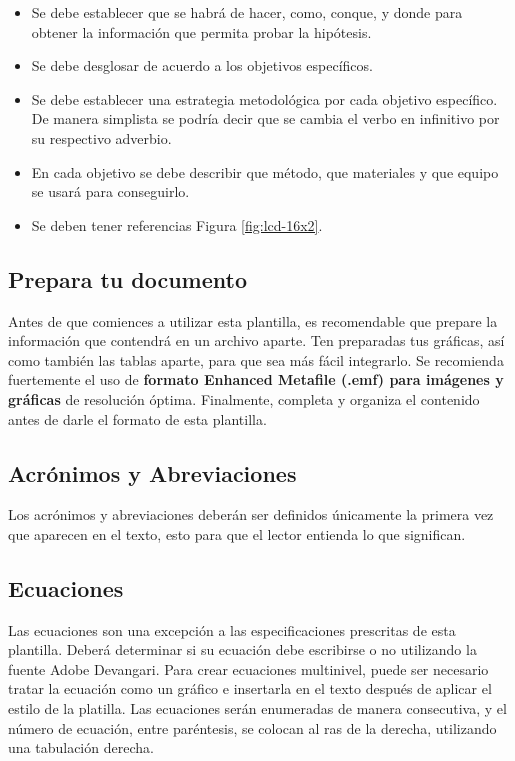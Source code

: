 \begin{itemize}
    \item Se debe establecer que se habrá de hacer, como, conque, y donde para obtener la información que permita probar la hipótesis.  
    \item Se debe desglosar de acuerdo a los objetivos específicos. 
    \item Se debe establecer una estrategia metodológica por cada objetivo específico. De manera simplista se podría decir que se cambia el verbo en infinitivo por su respectivo adverbio.
    \item En cada objetivo se debe describir que método, que materiales y que equipo se usará para conseguirlo.
    \item Se deben tener referencias Figura \ref{fig:lcd-16x2}.
\end{itemize}
% 
% 

% 
% 
\subsection{Prepara tu documento}

Antes de que comiences a utilizar esta plantilla, es recomendable que prepare la información que contendrá en un archivo aparte. 
Ten preparadas tus gráficas, así como también las tablas aparte, para que sea más fácil integrarlo. 
Se recomienda fuertemente el uso de \textbf{formato Enhanced Metafile (.emf) para imágenes y gráficas} de resolución óptima. 
Finalmente, completa y organiza el contenido antes de darle el formato de esta plantilla. 

\subsection{Acrónimos y Abreviaciones}

Los acrónimos y abreviaciones deberán ser definidos únicamente la primera vez que aparecen en el texto, esto para que el lector entienda lo que significan.

\subsection{Ecuaciones}

Las ecuaciones son una excepción a las especificaciones prescritas de esta plantilla. 
Deberá determinar si su ecuación debe escribirse o no utilizando la fuente Adobe Devangari. 
Para crear ecuaciones multinivel, puede ser necesario tratar la ecuación como un gráfico e insertarla en el texto después de aplicar el estilo de la platilla.
Las ecuaciones serán enumeradas de manera consecutiva, y el número de ecuación, entre paréntesis, se colocan al ras de la derecha, utilizando una tabulación derecha. 

